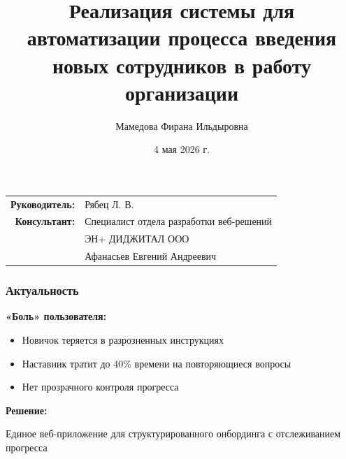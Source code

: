 \documentclass{beamer}
\title{Реализация системы для автоматизации процесса введения новых сотрудников в работу организации}
\author{Мамедова Фирана Ильдыровна}
\institute{Иркутский государственный университет}
\date{4 мая 2026 г.}
\begin{document}
\begin{frame}
    \titlepage
    
    \vspace{0.5cm}
    \begin{center}
        \begin{tabular}{rl}
            \textbf{Руководитель:} & Рябец Л. В. \\[2pt]
            \textbf{Консультант:} & Специалист отдела разработки веб-решений \\
                                   & ЭН+ ДИДЖИТАЛ ООО\\
                                   & Афанасьев Евгений Андреевич \\
        \end{tabular}
    \end{center}
\end{frame}

\begin{frame}
    \frametitle{Актуальность}
    
    \textbf{«Боль» пользователя:}
    \begin{itemize}
        \item Новичок теряется в разрозненных инструкциях
        \item Наставник тратит до 40\% времени на повторяющиеся вопросы
        \item Нет прозрачного контроля прогресса
    \end{itemize}
    
    \vspace{0.4cm}
    \textbf{Решение:}
    
    Единое веб-приложение для структурированного онбординга с отслеживанием прогресса
\end{frame}
\end{document}
